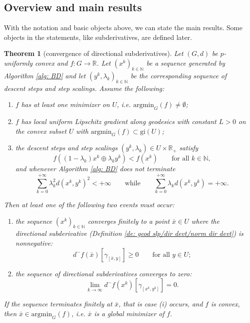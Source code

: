 \documentclass{article}
\theoremstyle{plain}\newtheorem{theorem}{Theorem}[section]
\theoremstyle{plain}\newtheorem{definition}[theorem]{Definition}
\theoremstyle{plain}\newtheorem{lemma}[theorem]{Lemma}
\theoremstyle{definition}\newtheorem{remark}[theorem]{Remark}
\theoremstyle{definition}\newtheorem{example}[theorem]{Example}
\theoremstyle{plain}\newtheorem{proposition}[theorem]{Proposition}
\theoremstyle{plain}\newtheorem{inference}[theorem]{Inference}
\theoremstyle{plain}\newtheorem{corollary}[theorem]{Corollary}
\theoremstyle{plain}\newtheorem{assumption}[theorem]{Assumption}
\newcommand{\xbar}{\bar{x}}
\newcommand{\bbN}{\mathbb{N}}
\begin{document}
\subsection{Overview and main results}
With the notation and basic objects above, we can state the main results. Some objects in the statements, like subderivatives, are defined later.
\begin{theorem}[convergence of directional subderivatives]\label{th: main summary 1}
    Let $(G,d)$ be $p$-uniformly convex and $f:G\to\mathbb{R}$. Let $(x^k)_{k\in\bbN}$ be a sequence generated by Algorithm \ref{alg: BD} and let $(y^k,\lambda_k)_{k\in\bbN}$ be the corresponding sequence of descent steps and step scalings. Assume the following:
    \begin{enumerate}
        \item[(a)] $f$ has at least one minimizer on $U$, i.e. $\mathrm{argmin}_G(f)\neq\emptyset$;
        \item[(b)] $f$ has local uniform Lipschitz gradient along geodesics with constant $L>0$ on the convex subset $U$ with $\mathrm{argmin}_G(f)\subset\mathrm{gi}(U)$;
        \item[(c)] the descent steps and step scalings $(y^k, \lambda_k)\in U\times \mathbb{R}_+$ satisfy
        $$
        f((1-\lambda_k)x^k\oplus\lambda_k y^k)<f(x^k) \qquad \text{for all}\,\,k\in\bbN,
        $$
        and whenever Algorithm \ref{alg: BD} does not terminate
        $$
        \sum_{k=0}^{+\infty}\lambda^2_kd(x^k, y^k)^2<+\infty \qquad\text{while}\qquad \sum_{k=0}^{+\infty}\lambda_kd(x^k, y^k)=+\infty.
        $$
    \end{enumerate}
    Then at least one of the following two events must occur:
    \begin{enumerate}
        \item[(i)]\label{th: main summary 1i} the sequence $(x^k)_{k\in\bbN}$ converges finitely to a point $\xbar\in U$ where the directional subderivative (Definition \ref{de: geod slp/dir devt/norm dir devt}) is nonnegative:
        $$
        d^-f(\bar{x})[\gamma_{[\bar{x}, y]}]\geq 0 \qquad\text{for all}\,\,y\in U;
        $$
        \item[(ii)]\label{th: main summary 1ii} the sequence of directional subderivatives converges to zero:
        $$
        \lim_{k\to\infty} d^-f(x^k)[\gamma_{[x^k, y^k]}]=0.
        $$
    \end{enumerate}
    If the sequence terminates finitely at $\xbar$, that is case (i) occurs, and $f$ is convex,
    then $\xbar\in\mathrm{argmin}_G(f)$, i.e. $\bar{x}$ is a global minimizer of $f$.
\end{theorem}
\end{document}
